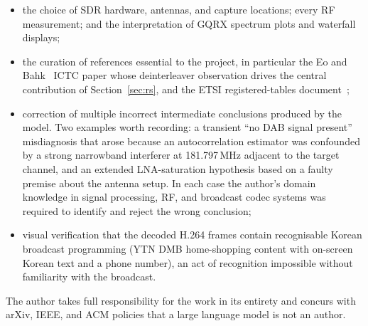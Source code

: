 \documentclass[11pt,a4paper]{article}
\begin{document}
\begin{itemize}[leftmargin=*,nosep]
\item the choice of SDR hardware, antennas, and capture locations;
      every RF measurement; and the interpretation of GQRX
      spectrum plots and waterfall displays;
\item the curation of references essential to the project, in
      particular the Eo and Bahk~\cite{eo2024tdmb} ICTC paper
      whose deinterleaver observation drives the central
      contribution of Section~\ref{sec:rs}, and the ETSI
      registered-tables document~\cite{etsi300401};
\item correction of multiple incorrect intermediate conclusions
      produced by the model.  Two examples worth recording: a
      transient ``no DAB signal present'' misdiagnosis that arose
      because an autocorrelation estimator was confounded by a
      strong narrowband interferer at 181.797\,MHz adjacent to the
      target channel, and an extended LNA-saturation hypothesis
      based on a faulty premise about the antenna setup.  In each
      case the author's domain knowledge in signal processing,
      RF, and broadcast codec systems was required to identify and
      reject the wrong conclusion;
\item visual verification that the decoded H.264 frames contain
      recognisable Korean broadcast programming (YTN DMB
      home-shopping content with on-screen Korean text and a phone
      number), an act of recognition impossible without familiarity
      with the broadcast.
\end{itemize}
The author takes full responsibility for the work in its entirety
and concurs with arXiv, IEEE, and ACM policies that a large
language model is not an author.

\printbibliography
\end{document}
